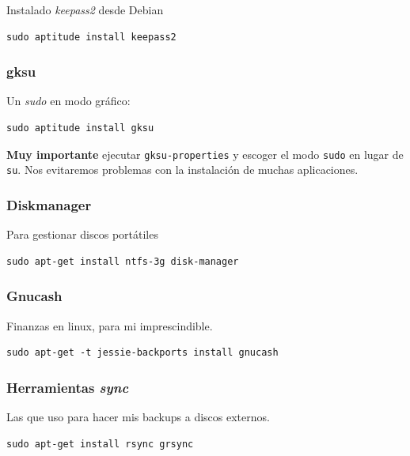 \documentclass[12pt,spanish,]{scrartcl}
\begin{document}
Instalado \emph{keepass2} desde Debian

\begin{verbatim}
sudo aptitude install keepass2
\end{verbatim}

\hypertarget{gksu}{%
\subsubsection{gksu}\label{gksu}}

Un \emph{sudo} en modo gráfico:

\begin{verbatim}
sudo aptitude install gksu
\end{verbatim}

\textbf{Muy importante} ejecutar \texttt{gksu-properties} y escoger el
modo \texttt{sudo} en lugar de \texttt{su}. Nos evitaremos problemas con
la instalación de muchas aplicaciones.

\hypertarget{diskmanager}{%
\subsubsection{Diskmanager}\label{diskmanager}}

Para gestionar discos portátiles

\begin{verbatim}
sudo apt-get install ntfs-3g disk-manager
\end{verbatim}

\hypertarget{gnucash}{%
\subsubsection{Gnucash}\label{gnucash}}

Finanzas en linux, para mi imprescindible.

\begin{verbatim}
sudo apt-get -t jessie-backports install gnucash
\end{verbatim}

\hypertarget{herramientas-sync}{%
\subsubsection{\texorpdfstring{Herramientas
\emph{sync}}{Herramientas sync}}\label{herramientas-sync}}

Las que uso para hacer mis backups a discos externos.

\begin{verbatim}
sudo apt-get install rsync grsync
\end{verbatim}
\end{document}
